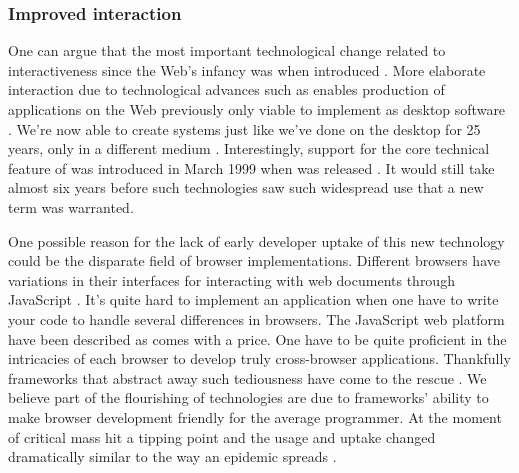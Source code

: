 \addline

\subsubsection{Improved interaction}
One can argue that the most important
technological change related to interactiveness since the Web's infancy was
when \citet{garrett05} introduced .%
More elaborate interaction due to technological advances such as 
enables production of applications on the Web previously only viable to
implement as desktop software .
We're now able to create systems just like we've done on the desktop for 25
years, only in a different medium \citep[]{arnowitz07}.
Interestingly, support for the core technical feature of  was
introduced in March 1999 when 
was released \citep{microsoft99}. It would still take almost six years before
such technologies saw such widespread use that a new term was warranted.

One possible reason for the lack of early developer uptake of this new
technology could be the disparate field of browser implementations.
Different browsers have variations in their interfaces for interacting with
web documents through JavaScript%
. It's quite hard to implement an application
when one have to write your code to handle several differences in browsers.
The JavaScript web platform have been described as
 comes with a price. One have to be quite proficient in the
intricacies of each browser to develop truly cross-browser applications.
Thankfully frameworks that abstract away such tediousness have come to
the rescue \citet[]{mesbah07}. We believe part of the flourishing of
 technologies are due to frameworks' ability to make browser
development friendly for the average programmer. At the moment of critical
mass  hit a tipping point and the usage and uptake changed
dramatically similar to the way an epidemic spreads
\citep[]{gladwell02}.

